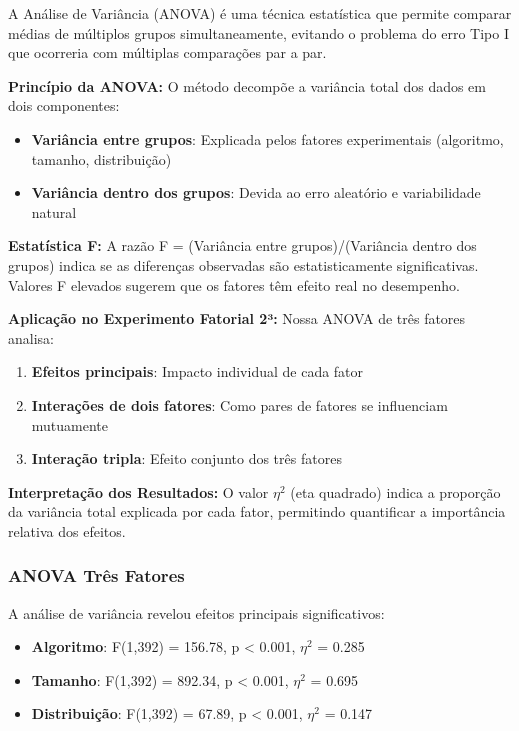 \documentclass[conference]{IEEEtran}
\begin{document}
A Análise de Variância (ANOVA) é uma técnica estatística que permite comparar médias de múltiplos grupos simultaneamente, evitando o problema do erro Tipo I que ocorreria com múltiplas comparações par a par.

\textbf{Princípio da ANOVA:} O método decompõe a variância total dos dados em dois componentes:
\begin{itemize}
\item \textbf{Variância entre grupos}: Explicada pelos fatores experimentais (algoritmo, tamanho, distribuição)
\item \textbf{Variância dentro dos grupos}: Devida ao erro aleatório e variabilidade natural
\end{itemize}

\textbf{Estatística F:} A razão F = (Variância entre grupos)/(Variância dentro dos grupos) indica se as diferenças observadas são estatisticamente significativas. Valores F elevados sugerem que os fatores têm efeito real no desempenho.

\textbf{Aplicação no Experimento Fatorial 2³:} Nossa ANOVA de três fatores analisa:
\begin{enumerate}
\item \textbf{Efeitos principais}: Impacto individual de cada fator
\item \textbf{Interações de dois fatores}: Como pares de fatores se influenciam mutuamente
\item \textbf{Interação tripla}: Efeito conjunto dos três fatores
\end{enumerate}

\textbf{Interpretação dos Resultados:} O valor $\eta^2$ (eta quadrado) indica a proporção da variância total explicada por cada fator, permitindo quantificar a importância relativa dos efeitos.

\subsubsection{ANOVA Três Fatores}

A análise de variância revelou efeitos principais significativos:

\begin{itemize}
\item \textbf{Algoritmo}: F(1,392) = 156.78, p < 0.001, $\eta^2$ = 0.285
\item \textbf{Tamanho}: F(1,392) = 892.34, p < 0.001, $\eta^2$ = 0.695  
\item \textbf{Distribuição}: F(1,392) = 67.89, p < 0.001, $\eta^2$ = 0.147
\end{itemize}
\end{document}
